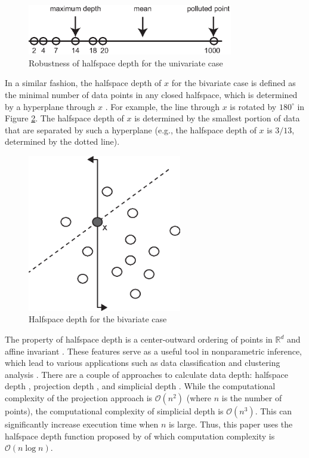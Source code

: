 \documentclass[a4paper,UKenglish]{lipics-v2016}
\begin{document}
\begin{figure}
	\centering
	\includegraphics[width=0.8\textwidth]{images/depth_uni.eps}
	\caption{Robustness of halfspace depth for the univariate case}
	\label{fig:hd_uni}	
\end{figure}


In a similar fashion, the halfspace depth of $x$ for the bivariate case is defined as the minimal number of data points in any closed halfspace, which is determined by a hyperplane through $x$ \cite{rousseeuw96RSS}. For example, the line through $x$ is rotated by $180^{\circ}$ in Figure \ref{fig:hd_bi}. The halfspace depth of $x$ is determined by the smallest portion of data that are separated by such a hyperplane (e.g.,  the halfspace depth of $x$ is $3/13$, determined by the dotted line).

\begin{figure}
	\centering
	\includegraphics[width=0.6\textwidth]{images/depth_bi.eps}
	\caption{Halfspace depth for the bivariate case}
	\label{fig:hd_bi}	
\end{figure}

The property of halfspace depth is a center-outward ordering of points in  $\mathbb{R}^d$ and affine invariant \cite{Mosler13book}. These features serve as a useful tool in nonparametric inference, which lead to various applications such as data classification and clustering analysis
\cite{lange14fSP,jeong16acmgis}. There are a couple of approaches to calculate data depth: halfspace depth \cite{rousseeuw96RSS}, projection depth \cite{wilcox03CSSC}, and simplicial depth \cite{liu90AS}. While the computational complexity of the projection approach is $\mathcal{O}(n^2)$ (where $n$ is the number of points), the computational complexity of simplicial depth is $\mathcal{O}(n^3)$. This can significantly increase execution time when $n$ is large. Thus, this paper uses the halfspace depth function proposed by \cite{rousseeuw96RSS} of which computation complexity is $\mathcal{O}(n\log{}n)$.
\end{document}
